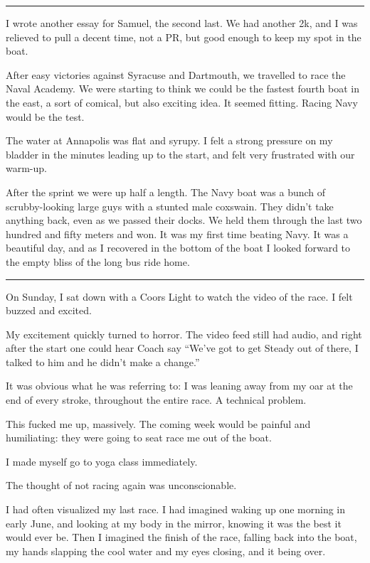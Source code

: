 \plainfancybreak{12pt}{2}{* * *}

I wrote another essay for Samuel, the second last.  We had another 2k, and I was
relieved to pull a decent time, not a PR, but good enough to keep my spot in the
boat.

After easy victories against Syracuse and Dartmouth, we travelled to race the
Naval Academy.  We were starting to think we could be the fastest fourth boat in
the east, a sort of comical, but also exciting idea.  It seemed fitting.  Racing
Navy would be the test.

The water at Annapolis was flat and syrupy.  I felt a strong pressure on my
bladder in the minutes leading up to the start, and felt very frustrated with
our warm-up.   

After the sprint we were up half a length.  The Navy boat was a bunch of
scrubby-looking large guys with a stunted male coxswain.  They didn't take
anything back, even as we passed their docks.  We held them through the last two
hundred and fifty meters and won.  It was my first time beating Navy.  It was a
beautiful day, and as I recovered in the bottom of the boat I looked forward to
the empty bliss of the long bus ride home.

\plainfancybreak{12pt}{2}{* * *}

On Sunday, I sat down with a Coors Light to watch the video of the race.  I felt
buzzed and excited. 

My excitement quickly turned to horror.  The video feed still had audio, and
right after the start one could hear Coach say ``We've got to get Steady out of
there, I talked to him and he didn't make a change.''  

It was obvious what he was referring to: I was leaning away from my oar at the
end of every stroke, throughout the entire race.  A technical problem.

This fucked me up, massively.  The coming week would be painful and humiliating:
they were going to seat race me out of the boat.

I made myself go to yoga class immediately.  

The thought of not racing again was unconscionable.  

I had often visualized my last race.  I had imagined waking up one morning in
early June, and looking at my body in the mirror, knowing it was the best it
would ever be.  Then I imagined the finish of the race, falling back into the
boat, my hands slapping the cool water and my eyes closing, and it being over.

